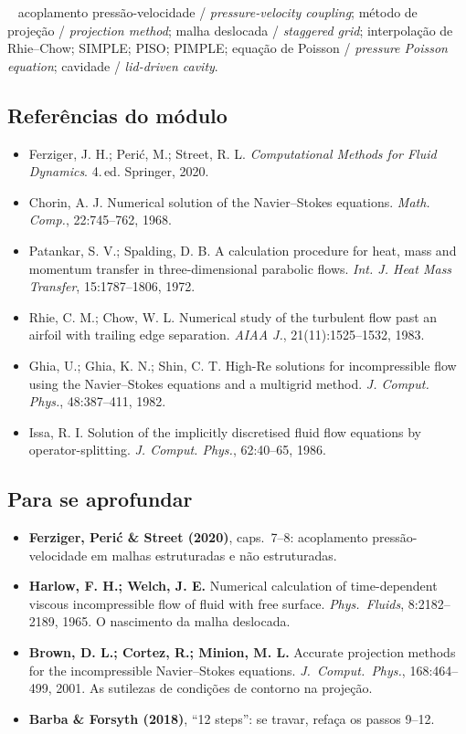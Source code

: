\documentclass[10pt,a4paper,twocolumn,openany]{report}
\newcommand{\lead}[2]{\par\medskip\noindent{\color{#1}\bfseries #2}\ }
\newenvironment{chaves}{\lead{cinza}{Palavras-chave (PT/EN):}\small}{\par}
\newenvironment{refs}{\subsection*{Referências do módulo}\small}{\par}
\newenvironment{aprofundar}{\subsection*{\textcolor{amarelo}{Para se aprofundar}}\small}{\par}
\begin{document}
\begin{chaves}
acoplamento pressão-velocidade / \emph{pressure-velocity coupling}; método
de projeção / \emph{projection method}; malha deslocada / \emph{staggered
grid}; interpolação de Rhie--Chow; SIMPLE; PISO; PIMPLE; equação de Poisson
/ \emph{pressure Poisson equation}; cavidade / \emph{lid-driven cavity}.
\end{chaves}

\begin{refs}
\begin{itemize}
  \item Ferziger, J. H.; Perić, M.; Street, R. L. \emph{Computational Methods for Fluid Dynamics}. 4.\,ed. Springer, 2020.
  \item Chorin, A. J. Numerical solution of the Navier--Stokes equations. \emph{Math. Comp.}, 22:745--762, 1968.
  \item Patankar, S. V.; Spalding, D. B. A calculation procedure for heat, mass and momentum transfer in three-dimensional parabolic flows. \emph{Int. J. Heat Mass Transfer}, 15:1787--1806, 1972.
  \item Rhie, C. M.; Chow, W. L. Numerical study of the turbulent flow past an airfoil with trailing edge separation. \emph{AIAA J.}, 21(11):1525--1532, 1983.
  \item Ghia, U.; Ghia, K. N.; Shin, C. T. High-Re solutions for incompressible flow using the Navier--Stokes equations and a multigrid method. \emph{J. Comput. Phys.}, 48:387--411, 1982.
  \item Issa, R. I. Solution of the implicitly discretised fluid flow equations by operator-splitting. \emph{J. Comput. Phys.}, 62:40--65, 1986.
\end{itemize}
\end{refs}

\begin{aprofundar}
\begin{itemize}[leftmargin=*]
  \item \textbf{Ferziger, Perić \& Street (2020)}, caps.\ 7--8: acoplamento pressão-velocidade em malhas estruturadas e não estruturadas.
  \item \textbf{Harlow, F. H.; Welch, J. E.} Numerical calculation of time-dependent viscous incompressible flow of fluid with free surface. \emph{Phys.\ Fluids}, 8:2182--2189, 1965. O nascimento da malha deslocada.
  \item \textbf{Brown, D. L.; Cortez, R.; Minion, M. L.} Accurate projection methods for the incompressible Navier--Stokes equations. \emph{J.\ Comput.\ Phys.}, 168:464--499, 2001. As sutilezas de condições de contorno na projeção.
  \item \textbf{Barba \& Forsyth (2018)}, ``12 steps'': se travar, refaça os passos 9--12.
\end{itemize}
\end{aprofundar}
\end{document}
